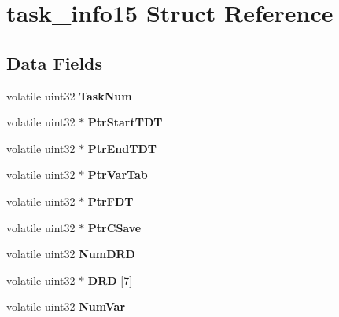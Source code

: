 \hypertarget{structtask__info15}{}\section{task\+\_\+info15 Struct Reference}
\label{structtask__info15}
\subsection*{Data Fields}
\begin{DoxyCompactItemize}
\item 
\mbox{\label{structtask__info15_adc05383386c492dfe76e76839a9a3a19}} 
volatile uint32 {\bfseries Task\+Num}
\item 
\mbox{\label{structtask__info15_a99b2845921b8e350bde2caa7af0d9bc3}} 
volatile uint32 $\ast$ {\bfseries Ptr\+Start\+T\+DT}
\item 
\mbox{\label{structtask__info15_ad9b2aba5945f1d2503049daf4fe2eecf}} 
volatile uint32 $\ast$ {\bfseries Ptr\+End\+T\+DT}
\item 
\mbox{\label{structtask__info15_a3fc9f669d5a97519b1b2366c4eaf64c0}} 
volatile uint32 $\ast$ {\bfseries Ptr\+Var\+Tab}
\item 
\mbox{\label{structtask__info15_a39067db279d52ec4db534eb0eeb977be}} 
volatile uint32 $\ast$ {\bfseries Ptr\+F\+DT}
\item 
\mbox{\label{structtask__info15_a4975fc7c642dde460e97f4a2dce12fd3}} 
volatile uint32 $\ast$ {\bfseries Ptr\+C\+Save}
\item 
\mbox{\label{structtask__info15_adaa9a69e2939114fd58dc283ff77ae88}} 
volatile uint32 {\bfseries Num\+D\+RD}
\item 
\mbox{\label{structtask__info15_a66e8a32184bcbee03407158e5fcecd09}} 
volatile uint32 $\ast$ {\bfseries D\+RD} \mbox{[}7\mbox{]}
\item 
\mbox{\label{structtask__info15_a466a94381e4dff46751398946aa823e6}} 
volatile uint32 {\bfseries Num\+Var}

\end{DoxyCompactItemize}
